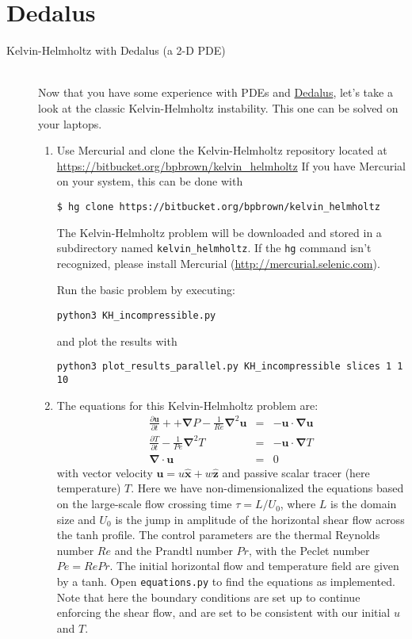\documentclass[12pt, preprint]{aastex}
\newcommand{\dedalus}{\href{http://dedalus-project.org}{Dedalus}}
\renewcommand{\vec}{\boldsymbol}
\newcommand{\del}{\vec{\nabla}}
\begin{document}
\section*{Dedalus}
\begin{description}
     \item[Kelvin-Helmholtz with Dedalus (a 2-D PDE)]~\\ 
    Now that you have some experience with PDEs and \dedalus, let's
    take a look at the classic Kelvin-Helmholtz instability.  This one
    can be solved on your laptops.
    \begin{enumerate}
      \item Use Mercurial and clone the Kelvin-Helmholtz repository located at
       \url{https://bitbucket.org/bpbrown/kelvin_helmholtz}
       If you have Mercurial on your system, this can be done with
{\footnotesize
\begin{verbatim}
$ hg clone https://bitbucket.org/bpbrown/kelvin_helmholtz
\end{verbatim}
}
       The Kelvin-Helmholtz problem will be downloaded and
       stored in a subdirectory named \verb+kelvin_helmholtz+.
       If the \verb+hg+ command isn't recognized, please install Mercurial (\url{http://mercurial.selenic.com}).
       
       Run the basic problem by executing:
\small{
\begin{verbatim}
python3 KH_incompressible.py
\end{verbatim}
}
and plot the results with
\small{
\begin{verbatim}
python3 plot_results_parallel.py KH_incompressible slices 1 1 10
\end{verbatim}
}

       \item The equations for this Kelvin-Helmholtz problem are:
         \begin{eqnarray}
           \frac{\partial \vec{u}}{\partial t} +
             +\del P - \frac{1}{Re}\del^2 \vec{u} &=& -\vec{u}\cdot\del\vec{u}
           \\
           \frac{\partial T}{\partial t} - \frac{1}{Pe}\del^2 T&=&
           -\vec{u}\cdot\del T \\
           \vec{\del}\cdot\vec{u} &=& 0 
         \end{eqnarray}
         with vector velocity $\vec{u} = u\vec{\hat{x}} + w
         \vec{\hat{z}}$ and passive scalar tracer (here temperature)
         $T$.  Here we have non-dimensionalized the equations based on
         the large-scale flow crossing time $\tau = L/U_0$, where $L$
         is the domain size and $U_0$ is the jump in amplitude of the
         horizontal shear flow across the tanh profile.
         The control
         parameters are the thermal Reynolds number $Re$ and the
         Prandtl number $Pr$, with the Peclet number $Pe=Re Pr$.  
         The initial horizontal flow and temperature field are given by a tanh.
         Open \verb+equations.py+ to find the equations
         as implemented. Note that here the boundary conditions are
         set up to continue enforcing the shear flow, and are set to
         be consistent with our initial $u$ and $T$.


\end{enumerate}
\end{description}
\end{document}

